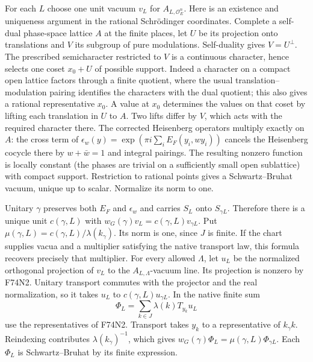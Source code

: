 For each $L$ choose one unit vacuum $v_L$ for
$A_{L,\mathcal O_E^n}$. Here is an existence and uniqueness
argument in the rational Schr\"odinger coordinates. Complete a
self-dual phase-space lattice $A$ at the finite places, let $U$
be its projection onto translations and $V$ its subgroup of pure
modulations. Self-duality gives $V=U^\perp$. The prescribed
semicharacter restricted to $V$ is a continuous character, hence
selects one coset $x_0+U$ of possible support. Indeed a character
on a compact open lattice factors through a finite quotient, where
the usual translation--modulation pairing identifies the characters
with the dual quotient; this also gives a rational representative
$x_0$. A value at $x_0$ determines the values on that coset by
lifting each translation in $U$ to $A$. Two lifts differ by $V$,
which acts with the required character there. The corrected
Heisenberg operators multiply exactly on $A$: the cross term of
$\epsilon_w(y)=\exp(\pi i\sum_i E_F(y_i,w y_i))$ cancels the
Heisenberg cocycle there by $w+\bar w=1$ and integral pairings.
The resulting nonzero function is locally constant (the phases
are trivial on a sufficiently small open sublattice) with compact
support. Restriction to rational points gives a Schwartz--Bruhat
vacuum, unique up to scalar. Normalize its norm to one.

Unitary $\gamma$ preserves both $E_F$ and $\epsilon_w$ and
carries $S_L$ onto $S_{\gamma L}$. Therefore there is a unique
unit $c(\gamma,L)$ with $w_G(\gamma)v_L=c(\gamma,L)v_{\gamma L}$.
Put $\mu(\gamma,L)=c(\gamma,L)/\lambda(k_\gamma)$.
Its norm is one, since $J$ is finite. If the chart supplies
vacua and a multiplier satisfying the native transport law, this
formula recovers precisely that multiplier. For every allowed
$\Lambda$, let $u_L$ be the normalized orthogonal projection of
$v_L$ to the $A_{L,\Lambda}$-vacuum line. Its projection is
nonzero by F74N2. Unitary transport commutes with the projector
and the real normalization, so it takes $u_L$ to
$c(\gamma,L)u_{\gamma L}$. In the native finite sum
\[
   \Phi_L=\sum_{k\in J}\lambda(k)T_{y_k}u_L
\]
use the representatives of F74N2. Transport takes $y_k$ to a
representative of $k_\gamma k$. Reindexing contributes
$\lambda(k_\gamma)^{-1}$, which gives
$w_G(\gamma)\Phi_L=\mu(\gamma,L)\Phi_{\gamma L}$. Each $\Phi_L$
is Schwartz--Bruhat by its finite expression.

